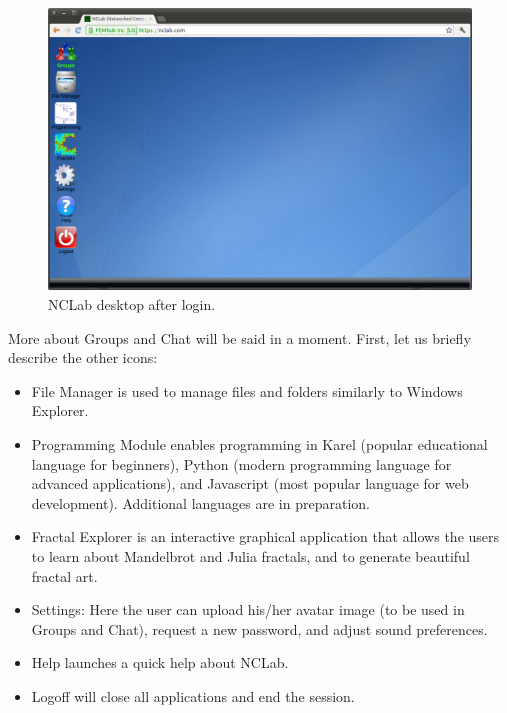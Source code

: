 \documentclass[article,A4,12pt]{llncs}
\begin{document}
\begin{figure}[!ht]
\begin{center}
\includegraphics[width=\textwidth]{img/desktop.png}
\end{center}
\caption{NCLab desktop after login.}
\label{fig:desktop}
\end{figure}

\noindent
More about Groups and Chat will be said in a moment. First, let us briefly 
describe the other icons:

\begin{itemize}
\item File Manager is used to manage files and folders similarly to Windows Explorer. 
\item Programming Module enables programming in Karel (popular educational language for beginners),
      Python (modern programming language for advanced applications), and Javascript 
      (most popular language for web development). Additional languages are in preparation.
\item Fractal Explorer is an interactive graphical application that allows the users
      to learn about Mandelbrot and Julia fractals, and to generate beautiful fractal art.
\item Settings: Here the user can upload his/her avatar image (to be used in Groups and Chat), 
      request a new password, and adjust sound preferences.
\item Help launches a quick help about NCLab.
\item Logoff will close all applications and end the session.
\end{itemize}
\end{document}
